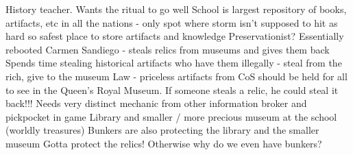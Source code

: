 \documentclass[char]{GL2020}
\begin{document}
\name{\cHistory{}}








History teacher. Wants the ritual to go well
School is largest repository of books, artifacts, etc in all the nations - only spot where storm isn’t supposed to hit as hard so safest place to store artifacts and knowledge
Preservationist?
Essentially rebooted Carmen Sandiego - steals relics from museums and gives them back
Spends time stealing historical artifacts who have them illegally - steal from the rich, give to the museum
Law - priceless artifacts from CoS should be held for all to see in the Queen’s Royal Museum.  
If someone steals a relic, he could steal it back!!!
Needs very distinct mechanic from other information broker and pickpocket in game
Library and smaller / more precious museum at the school (worldly treasures)
Bunkers are also protecting the library and the smaller museum
Gotta protect the relics!  Otherwise why do we even have bunkers?
\end{document}
